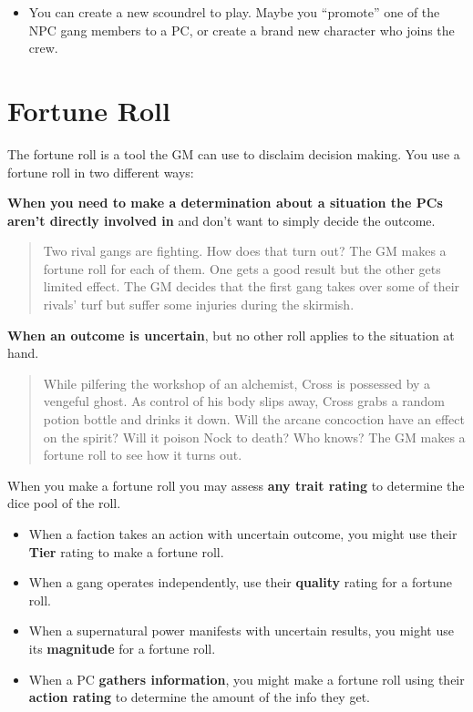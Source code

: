 \documentclass[11pt,oneside]{book}
\begin{document}
\begin{itemize}
	\item You can create a new scoundrel to play. Maybe you “promote” one of the NPC gang members to a PC, or create a brand new character who joins the crew.
\end{itemize}

\chapter{Fortune Roll}

The fortune roll is a tool the GM can use to disclaim decision making. You use a fortune roll in two different ways:

\textbf{When you need to make a determination about a situation the PCs aren’t directly involved in} and don’t want to simply decide the outcome.

\begin{quote}
	Two rival gangs are fighting. How does that turn out? The GM makes a fortune roll for each of them. One gets a good result but the other gets limited effect. The GM decides that the first gang takes over some of their rivals’ turf but suffer some injuries during the skirmish.
\end{quote}

\textbf{When an outcome is uncertain}, but no other roll applies to the situation at hand.

\begin{quote}
	While pilfering the workshop of an alchemist, Cross is possessed by a vengeful ghost. As control of his body slips away, Cross grabs a random potion bottle and drinks it down. Will the arcane concoction have an effect on the spirit? Will it poison Nock to death? Who knows? The GM makes a fortune roll to see how it turns out.
\end{quote}

When you make a fortune roll you may assess \textbf{any trait rating} to determine the dice pool of the roll.

\begin{itemize}
	\item When a faction takes an action with uncertain outcome, you might use their \textbf{Tier} rating to make a fortune roll.
	\item When a gang operates independently, use their \textbf{quality} rating for a fortune roll.
	\item When a supernatural power manifests with uncertain results, you might use its \textbf{magnitude} for a fortune roll.
	\item When a PC \textbf{gathers information}, you might make a fortune roll using their \textbf{action rating} to determine the amount of the info they get.
\end{itemize}
\end{document}
